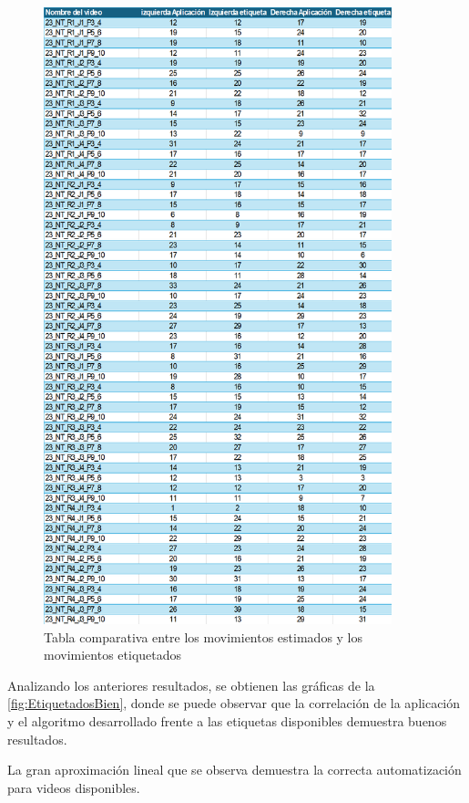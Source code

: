 \begin{figure}[H]
    \centering
    \includegraphics[width=0.9\textwidth]{images/7/ValidacionMovimientos.png}
    \caption{Tabla comparativa entre los movimientos estimados y los movimientos etiquetados}
    \label{fig:TablaResultados}
\end{figure}
\clearpage
Analizando los anteriores resultados, se obtienen las gráficas de la \autoref{fig:EtiquetadosBien}, donde se puede observar que la correlación de la aplicación y el algoritmo desarrollado frente a las etiquetas disponibles demuestra buenos resultados.

La gran aproximación lineal que se observa demuestra la correcta automatización para videos disponibles.

